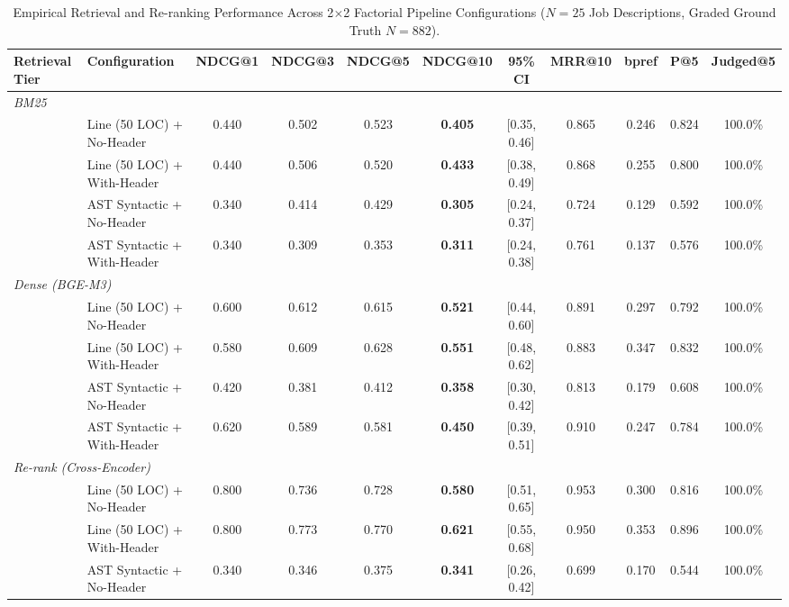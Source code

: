 \begin{table}[t]
\centering
\small
\caption{Empirical Retrieval and Re-ranking Performance Across 2$\times$2 Factorial Pipeline Configurations ($N=25$ Job Descriptions, Graded Ground Truth $N=882$).}
\label{tab:retrieval_2x2}
\begin{tabular}{llccccccccc}
\toprule
\textbf{Retrieval Tier} & \textbf{Configuration} & \textbf{NDCG@1} & \textbf{NDCG@3} & \textbf{NDCG@5} & \textbf{NDCG@10} & \textbf{95\% CI} & \textbf{MRR@10} & \textbf{bpref} & \textbf{P@5} & \textbf{Judged@5} \\
\midrule
\multicolumn{11}{l}{\textit{BM25}} \\
  & Line (50 LOC) + No-Header      & 0.440 & 0.502 & 0.523 & \textbf{0.405} & [0.35, 0.46] & 0.865 & 0.246 & 0.824 & 100.0\% \\
  & Line (50 LOC) + With-Header    & 0.440 & 0.506 & 0.520 & \textbf{0.433} & [0.38, 0.49] & 0.868 & 0.255 & 0.800 & 100.0\% \\
  & AST Syntactic + No-Header      & 0.340 & 0.414 & 0.429 & \textbf{0.305} & [0.24, 0.37] & 0.724 & 0.129 & 0.592 & 100.0\% \\
  & AST Syntactic + With-Header    & 0.340 & 0.309 & 0.353 & \textbf{0.311} & [0.24, 0.38] & 0.761 & 0.137 & 0.576 & 100.0\% \\
\midrule
\multicolumn{11}{l}{\textit{Dense (BGE-M3)}} \\
  & Line (50 LOC) + No-Header      & 0.600 & 0.612 & 0.615 & \textbf{0.521} & [0.44, 0.60] & 0.891 & 0.297 & 0.792 & 100.0\% \\
  & Line (50 LOC) + With-Header    & 0.580 & 0.609 & 0.628 & \textbf{0.551} & [0.48, 0.62] & 0.883 & 0.347 & 0.832 & 100.0\% \\
  & AST Syntactic + No-Header      & 0.420 & 0.381 & 0.412 & \textbf{0.358} & [0.30, 0.42] & 0.813 & 0.179 & 0.608 & 100.0\% \\
  & AST Syntactic + With-Header    & 0.620 & 0.589 & 0.581 & \textbf{0.450} & [0.39, 0.51] & 0.910 & 0.247 & 0.784 & 100.0\% \\
\midrule
\multicolumn{11}{l}{\textit{Re-rank (Cross-Encoder)}} \\
  & Line (50 LOC) + No-Header      & 0.800 & 0.736 & 0.728 & \textbf{0.580} & [0.51, 0.65] & 0.953 & 0.300 & 0.816 & 100.0\% \\
  & Line (50 LOC) + With-Header    & 0.800 & 0.773 & 0.770 & \textbf{0.621} & [0.55, 0.68] & 0.950 & 0.353 & 0.896 & 100.0\% \\
  & AST Syntactic + No-Header      & 0.340 & 0.346 & 0.375 & \textbf{0.341} & [0.26, 0.42] & 0.699 & 0.170 & 0.544 & 100.0\% \\

\end{tabular}
\end{table}
